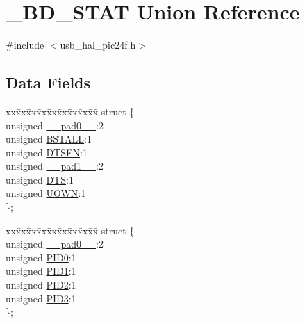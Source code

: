 \hypertarget{union___b_d___s_t_a_t}{}\section{\+\_\+\+B\+D\+\_\+\+S\+T\+AT Union Reference}
\label{union___b_d___s_t_a_t}


{\ttfamily \#include $<$usb\+\_\+hal\+\_\+pic24f.\+h$>$}

\subsection*{Data Fields}
\begin{DoxyCompactItemize}
\item 
\begin{tabbing}
xx\=xx\=xx\=xx\=xx\=xx\=xx\=xx\=xx\=\kill
struct \{\\
\>unsigned \mbox{\hyperlink{union___b_d___s_t_a_t_adf71f3d8410c1f1dbbc96680a92c49af}{\_\_pad0\_\_}}:2\\
\>unsigned \mbox{\hyperlink{union___b_d___s_t_a_t_a145ee75f12c62d2a89097d18477019f2}{BSTALL}}:1\\
\>unsigned \mbox{\hyperlink{union___b_d___s_t_a_t_adeff6f5de2d8ca0cfa956560288c3541}{DTSEN}}:1\\
\>unsigned \mbox{\hyperlink{union___b_d___s_t_a_t_acaf2d0924a107ec6e8d2e31febaf66f9}{\_\_pad1\_\_}}:2\\
\>unsigned \mbox{\hyperlink{union___b_d___s_t_a_t_a74db087bfe32cd33c459191f7a4aeb13}{DTS}}:1\\
\>unsigned \mbox{\hyperlink{union___b_d___s_t_a_t_abc982c28d59f8e36dbcb06639010169d}{UOWN}}:1\\
\}; \\

\end{tabbing}\item 
\begin{tabbing}
xx\=xx\=xx\=xx\=xx\=xx\=xx\=xx\=xx\=\kill
struct \{\\
\>unsigned \mbox{\hyperlink{union___b_d___s_t_a_t_adf71f3d8410c1f1dbbc96680a92c49af}{\_\_pad0\_\_}}:2\\
\>unsigned \mbox{\hyperlink{union___b_d___s_t_a_t_a810a2f6d15fc42c5d1e610b6e927d2eb}{PID0}}:1\\
\>unsigned \mbox{\hyperlink{union___b_d___s_t_a_t_acefd8c6eba334031c18cd877dfe08bfb}{PID1}}:1\\
\>unsigned \mbox{\hyperlink{union___b_d___s_t_a_t_aef3d6a9445a3c61d870212360c0a6110}{PID2}}:1\\
\>unsigned \mbox{\hyperlink{union___b_d___s_t_a_t_a771971768126aebea428ac7194b17fc0}{PID3}}:1\\
\}; \\


\end{tabbing}
\end{DoxyCompactItemize}

